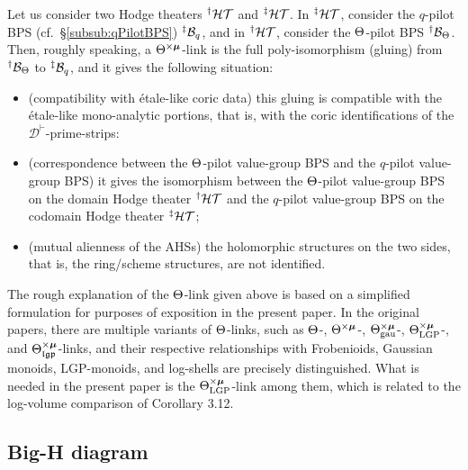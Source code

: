 \documentclass[12pt, reqno, a4paper]{amsart}
\def\cD{{\mathcal{D}}}
\def\bmu{\bm{\mu}}
\def\xmu{\times\bmu}
\begin{document}
Let us consider two Hodge theaters $\HT[\dag]$ and $\HT[\ddag]$.
In $\HT[\ddag]$, consider the $q$-pilot BPS (cf.\ \S\ref{subsub:qPilotBPS}) $\BPS[\ddag]_q$, and in $\HT[\dag]$, consider the $\Th$-pilot BPS $\BPS[\dag]_{\Th}$.
Then, roughly speaking, a \(\Th^{\xmu}\)-link is the full poly-isomorphism (gluing) from $\BPS[\dag]_{\Th}$ to $\BPS[\ddag]_q$, and it gives the following situation:

\begin{itemize}
\item[(a)] (compatibility with \'etale-like coric data) this gluing is compatible with the \'etale-like mono-analytic portions, that is, with the coric identifications of the \(\cD^{\vdash}\)-prime-strips:

\item[(b)] (correspondence between the \(\Th\)-pilot value-group BPS and the \(q\)-pilot value-group BPS) it gives the isomorphism between the $\Th$-pilot value-group BPS on the domain Hodge theater $\HT[\dag]$ and the $q$-pilot value-group BPS on the codomain Hodge theater $\HT[\ddag]$;

\item[(c)] (mutual alienness of the AHSs) the holomorphic structures on the two sides, that is, the ring/scheme structures, are not identified.
\end{itemize}

\begin{rem}
The rough explanation of the $\Th$-link given above is based on a simplified formulation for purposes of exposition in the present paper.
In the original papers, there are multiple variants of \(\Th\)-links, such as \(\Th\)-, \(\Thxmu\)-, \(\Thxmu_{\mathrm{gau}}\)-, \(\ThxmuLGP\)-, and \(\Thxmu_{\mathfrak{lgp}}\)-links, and their respective relationships with Frobenioids, Gaussian monoids, LGP-monoids, and log-shells are precisely distinguished.
What is needed in the present paper is the \(\ThxmuLGP\)-link among them, which is related to the log-volume comparison of Corollary 3.12.
\end{rem}

\subsection{Big-H diagram}\label{sub:BigHdiagram}
\end{document}
